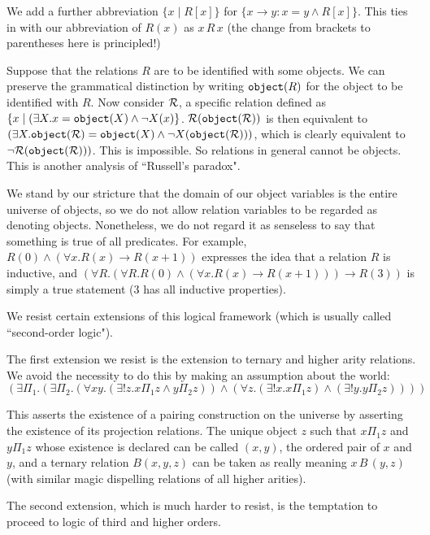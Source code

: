 \documentclass[12pt]{book}
\begin{document}
We add a further abbreviation $\{x \mid R[x]\}$ for $\{x \rightarrow y : x=y \wedge R[x]\}$.  This ties in with our abbreviation of $R(x)$ as $x\,R\,x$ (the change from brackets to parentheses here is principled!)

Suppose that the relations $R$ are to be identified with some objects.  We can preserve the grammatical distinction by writing ${\tt object}(R)$
for the object to be identified with $R$.  Now consider $\cal R$, a specific relation defined as $\{x \mid (\exists X.x={\tt object}(X) \wedge \neg X(x)\}$.  ${\cal R}({\tt object}({\cal R}))$ is then equivalent to $(\exists X.{\tt object}({\cal R})={\tt object}(X) \wedge \neg X({\tt object}({\cal R})))$, which is clearly equivalent to $\neg {\cal R}({\tt object}({\cal R})))$.  This is impossible.  So relations in general cannot be objects.  This is another analysis of ``Russell's paradox".

We stand by our stricture that the domain of our object variables is the entire universe of objects, so we do not allow relation variables to be regarded as denoting objects.  Nonetheless, we do not regard it as senseless to say that something is true of all predicates.  For example,
$R(0) \wedge (\forall x.R(x) \rightarrow R(x+1))$ expresses the idea that a relation $R$ is inductive, and $(\forall R.(\forall R.R(0) \wedge (\forall x.R(x) \rightarrow R(x+1))) \rightarrow R(3))$ is simply a true statement (3 has all inductive properties).

We resist certain extensions of this logical framework (which is usually called ``second-order logic").

The first extension we resist is the extension to ternary and higher arity relations.  We avoid the necessity to do this by making an assumption about the world:  $$(\exists \Pi_1.(\exists \Pi_2.(\forall xy.(\exists!z.x \Pi_1 z \wedge y \Pi_2 z)) \wedge (\forall z.(\exists!x.x \Pi_1 z) \wedge (\exists!y.y \Pi_2 z))))$$

This asserts the existence of a pairing construction on the universe by asserting the existence of its projection relations.  The unique object $z$ such that $x\Pi_1 z$ and $y \Pi_1 z$ whose existence is declared can be called $(x,y)$, the ordered pair of $x$ and $y$, and a ternary relation $B(x,y,z)$ can be taken as really meaning $x\,B\,(y,z)$ (with similar magic dispelling relations of all higher arities).

The second extension, which is much harder to resist, is the temptation to proceed to logic of third and higher orders.
\end{document}
